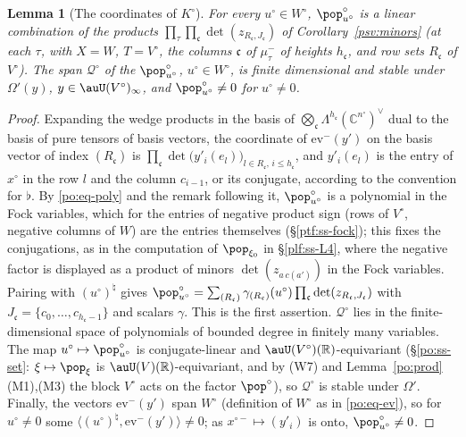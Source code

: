 \documentclass[10pt]{amsart}
\newtheorem{lemma}[theorem]{Lemma}
\theoremstyle{definition}
\theoremstyle{remark}
\newcommand{\C}{\mathbb C}
\newcommand{\R}{\mathbb R}
\begin{document}
\begin{lemma}[The coordinates of $K^\circ$]\label{psv:coords}
For every $u^\circ\in W^\circ$, $\pop^\circ_{u^\circ}$ is a linear combination of the products
$\prod_\tau\prod_{\mathfrak c}\det(z_{R_{\mathfrak c},J_{\mathfrak c}})$ of Corollary~\ref{psv:minors} \textup(at each
$\tau$, with $X=W$, $T=V^\circ$, the columns $\mathfrak c$ of $\mu^-_\tau$ of heights $h_{\mathfrak c}$, and row sets
$R_{\mathfrak c}$ of $V^\circ$\textup). The span $\mathcal Q^\circ$ of the $\pop^\circ_{u^\circ}$, $u^\circ\in W^\circ$, is
finite dimensional and stable under $\Omega'(y)$, $y\in\auU(V^\circ)_\infty$, and $\pop^\circ_{u^\circ}\ne0$ for
$u^\circ\ne0$.
\end{lemma}
\begin{proof}
Expanding the wedge products in the basis of $\bigotimes_{\mathfrak c}\Lambda^{h_{\mathfrak c}}(\C^{n^\circ})^\vee$
dual to the basis of pure tensors of basis vectors, the coordinate of $\mathrm{ev}^-(y')$ on the basis vector
of index $(R_{\mathfrak c})$ is $\prod_{\mathfrak c}\det\bigl(y'_i(e_l)\bigr)_{l\in R_{\mathfrak c},\,i\le h_{\mathfrak c}}$, and
$y'_i(e_l)$ is the entry of $x^\circ$ in the row $l$ and the column $c_{i-1}$, or its conjugate, according to
the convention for $\flat$. By \eqref{po:eq-poly} and the remark following it, $\pop^\circ_{u^\circ}$ is a
polynomial in the Fock variables, which for the entries of negative product sign (rows of $V^\circ$,
negative columns of $W$) are the entries themselves (\S\ref{ptf:ss-fock}); this fixes the conjugations,
as in the computation of $\pop_{\xi_0}$ in \S\ref{plf:ss-L4}, where the negative factor is displayed as a
product of minors $\det(z_{a\,c(a')})$ in the Fock variables. Pairing with $(u^\circ)^\natural$ gives
$\pop^\circ_{u^\circ}=\sum_{(R_{\mathfrak c})}\gamma_{(R_{\mathfrak c})}(u^\circ)\prod_{\mathfrak c}\det(z_{R_{\mathfrak c},J_{\mathfrak c}})$ with
$J_{\mathfrak c}=\{c_0,\dots,c_{h_{\mathfrak c}-1}\}$ and scalars $\gamma$. This is the first assertion. $\mathcal Q^\circ$ lies
in the finite-dimensional space of polynomials of bounded degree in finitely many variables. The map
$u^\circ\mapsto\pop^\circ_{u^\circ}$ is conjugate-linear and $\auU(V^\circ)(\R)$-equivariant (\S\ref{po:ss-set}:
$\xi\mapsto\pop_\xi$ is $\auU(V)(\R)$-equivariant, and by (W7) and Lemma~\ref{po:prod}(M1),(M3) the block
$V^\circ$ acts on the factor $\pop^\circ$), so $\mathcal Q^\circ$ is stable under $\Omega'$. Finally, the vectors
$\mathrm{ev}^-(y')$ span $W^\circ$ (definition of $W^\circ$ as in \eqref{po:eq-ev}), so for $u^\circ\ne0$ some
$\langle(u^\circ)^\natural,\mathrm{ev}^-(y')\rangle\ne0$; as $x^{\circ-}\mapsto(y'_i)$ is onto, $\pop^\circ_{u^\circ}\ne0$.
\end{proof}
\end{document}
